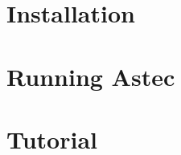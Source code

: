 \documentclass{report}
\begin{document}
\tableofcontents

\chapter{Installation}




\chapter{Running Astec}




\chapter{Tutorial}



\end{document}
